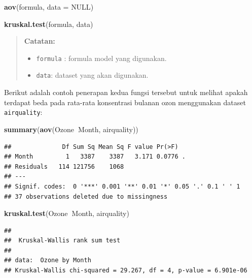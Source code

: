 \documentclass[]{book}
\newenvironment{Shaded}{\begin{snugshade}}{\end{snugshade}}
\newcommand{\DataTypeTok}[1]{\textcolor[rgb]{0.13,0.29,0.53}{#1}}
\newcommand{\KeywordTok}[1]{\textcolor[rgb]{0.13,0.29,0.53}{\textbf{#1}}}
\newcommand{\NormalTok}[1]{#1}
\newcommand{\OperatorTok}[1]{\textcolor[rgb]{0.81,0.36,0.00}{\textbf{#1}}}
\newcommand{\OtherTok}[1]{\textcolor[rgb]{0.56,0.35,0.01}{#1}}
\providecommand{\tightlist}{%
  \setlength{\itemsep}{0pt}\setlength{\parskip}{0pt}}
\theoremstyle{definition}
\theoremstyle{definition}
\theoremstyle{definition}
\theoremstyle{remark}
\begin{document}
\begin{Shaded}
\begin{Highlighting}[]
\KeywordTok{aov}\NormalTok{(formula, }\DataTypeTok{data =} \OtherTok{NULL}\NormalTok{)}

\KeywordTok{kruskal.test}\NormalTok{(formula, data)}
\end{Highlighting}
\end{Shaded}

\begin{quote}
\textbf{Catatan:}

\begin{itemize}
\tightlist
\item
  \texttt{formula} : formula model yang digunakan.
\item
  \texttt{data}: dataset yang akan digunakan.
\end{itemize}
\end{quote}

Berikut adalah contoh penerapan kedua fungsi tersebut untuk melihat apakah terdapat beda pada rata-rata konsentrasi bulanan ozon menggunakan dataset \texttt{airquality}:

\begin{Shaded}
\begin{Highlighting}[]
\KeywordTok{summary}\NormalTok{(}\KeywordTok{aov}\NormalTok{(Ozone}\OperatorTok{~}\NormalTok{Month, airquality))}
\end{Highlighting}
\end{Shaded}

\begin{verbatim}
##              Df Sum Sq Mean Sq F value Pr(>F)  
## Month         1   3387    3387   3.171 0.0776 .
## Residuals   114 121756    1068                 
## ---
## Signif. codes:  0 '***' 0.001 '**' 0.01 '*' 0.05 '.' 0.1 ' ' 1
## 37 observations deleted due to missingness
\end{verbatim}

\begin{Shaded}
\begin{Highlighting}[]
\KeywordTok{kruskal.test}\NormalTok{(Ozone}\OperatorTok{~}\NormalTok{Month, airquality)}
\end{Highlighting}
\end{Shaded}

\begin{verbatim}
## 
##  Kruskal-Wallis rank sum test
## 
## data:  Ozone by Month
## Kruskal-Wallis chi-squared = 29.267, df = 4, p-value = 6.901e-06
\end{verbatim}
\end{document}
